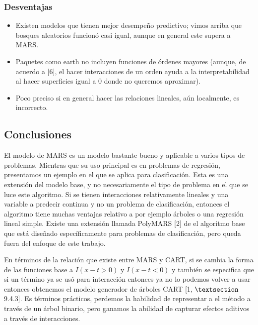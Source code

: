 \documentclass[
]{article}
\providecommand{\tightlist}{%
  \setlength{\itemsep}{0pt}\setlength{\parskip}{0pt}}
\begin{document}
\hypertarget{desventajas}{%
\subsubsection{Desventajas}\label{desventajas}}

\begin{itemize}
\tightlist
\item
  Existen modelos que tienen mejor desempeño predictivo; vimos arriba
  que bosques aleatorios funcionó casi igual, aunque en general este
  supera a MARS.
\item
  Paquetes como earth no incluyen funciones de órdenes mayores (aunque,
  de acuerdo a {[}6{]}, el hacer interacciones de un orden ayuda a la
  interpretabilidad al hacer superficies igual a 0 donde no queremos
  aproximar).
\item
  Poco preciso si en general hacer las relaciones lineales, aún
  localmente, es incorrecto.
\end{itemize}

\hypertarget{conclusiones}{%
\subsection{Conclusiones}\label{conclusiones}}

El modelo de MARS es un modelo bastante bueno y aplicable a varios tipos
de problemas. Mientras que su uso principal es en problemas de
regresión, presentamos un ejemplo en el que se aplica para
clasificación. Esta es una extensión del modelo base, y no
necesariamente el tipo de problema en el que se luce este algoritmo. Si
se tienen interacciones relativamente lineales y una variable a predecir
continua y no un problema de clasificación, entonces el algoritmo tiene
muchas ventajas relativo a por ejemplo árboles o una regresión lineal
simple. Existe una extensión llamada PolyMARS {[}2{]} de el algoritmo
base que está diseñado específicamente para problemas de clasificación,
pero queda fuera del enfoque de este trabajo.

En términos de la relación que existe entre MARS y CART, si se cambia la
forma de las funciones base a \(I(x-t > 0)\) y \(I(x-t < 0)\) y también
se especifica que si un término ya se usó para interacción entonces ya
no lo podemos volver a usar entonces obtenemos el modelo generador de
árboles CART {[}1, \(\textsection\) 9.4.3{]}. Es términos prácticos,
perdemos la habilidad de representar a el método a través de un árbol
binario, pero ganamos la abilidad de capturar efectos aditivos a través
de interacciones.
\end{document}
